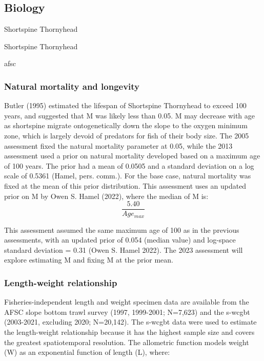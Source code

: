 \documentclass[11pt,
  english,
  letterpaper,
]{article}
\begin{document}
\hypertarget{biology}{%
\subsection{Biology}\label{biology}}

Shortspine Thornyhead

Shortspine Thornyhead

\gls{afsc}

\hypertarget{natural-mortality-and-longevity}{%
\subsubsection{Natural mortality and longevity}\label{natural-mortality-and-longevity}}

Butler (1995) estimated the lifespan of Shortspine Thornyhead to exceed 100 years, and suggested that M was likely less than 0.05. M may decrease with age as shortspine migrate ontogenetically down the slope to the oxygen minimum zone, which is largely devoid of predators for fish of their body size. The 2005 assessment fixed the natural mortality parameter at 0.05, while the 2013 assessment used a prior on natural mortality developed based on a maximum age of 100 years. The prior had a mean of 0.0505 and a standard deviation on a log scale of 0.5361 (Hamel, pers. comm.). For the base case, natural mortality was fixed at the mean of this prior distribution. This assessment uses an updated prior on M by Owen S. Hamel (2022), where the median of M is: \begin{equation} \frac{5.40}{Age_{max}} \end{equation}

This assessment assumed the same maximum age of 100 as in the previous assessments, with an updated prior of 0.054 (median value) and log-space standard deviation = 0.31 (Owen S. Hamel 2022). The 2023 assessment will explore estimating M and fixing M at the prior mean.

\hypertarget{length-weight-relationship}{%
\subsubsection{Length-weight relationship}\label{length-weight-relationship}}

Fisheries-independent length and weight specimen data are available from the AFSC slope bottom trawl survey (1997, 1999-2001; N=7,623) and the \gls{s-wcgbt} (2003-2021, excluding 2020; N=20,142). The \gls{s-wcgbt} data were used to estimate the length-weight relationship because it has the highest sample size and covers the greatest spatiotemporal resolution. The allometric function models weight (W) as an exponential function of length (L), where:
\end{document}
